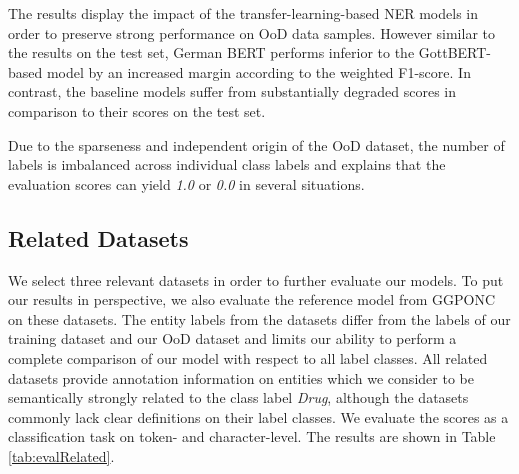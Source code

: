 \documentclass[runningheads]{llncs}
\begin{document}
The results display the impact of the transfer-learning-based NER models in order to preserve strong performance on OoD data samples. However similar to the results on the test set, German BERT performs inferior to the GottBERT-based model by an increased margin according to the weighted F1-score. In contrast, the baseline models suffer from substantially degraded scores in comparison to their scores on the test set.

Due to the sparseness and independent origin of the OoD dataset, the number of labels is imbalanced across individual class labels and explains that the evaluation scores can yield \textit{1.0} or \textit{0.0} in several situations.

\subsection{Related Datasets}

We select three relevant datasets in order to further evaluate our models. To put our results in perspective, we also evaluate the reference model from GGPONC\cite{borchert_ggponc_2022} on these datasets. The entity labels from the datasets differ from the labels of our training dataset and our OoD dataset and limits our ability to perform a complete comparison of our model with respect to all label classes. All related datasets provide annotation information on entities which we consider to be semantically strongly related to the class label \textit{Drug}, although the datasets commonly lack clear definitions on their label classes. We evaluate the scores as a classification task on token- and character-level. The results are shown in Table \ref{tab:evalRelated}.
\end{document}
